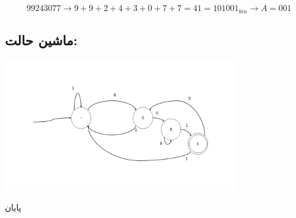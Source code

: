 \documentclass[a4paper]{article}
\newcommand{\goodbye}{\begin{center}{\huge
پایان
}\end{center}}
\begin{document}
\section{}
\begin{displaymath}
99243077 \rightarrow 9 + 9 + 2 + 4 + 3 + 0 + 7 + 7 = 41 = 101001_{bin} \rightarrow A = 001
\end{displaymath}

\subsection*{ماشین حالت:}
\begin{center}
\includegraphics[width=10cm]{images/state-machine.png}
\end{center}

\newpage
\goodbye
\end{document}
